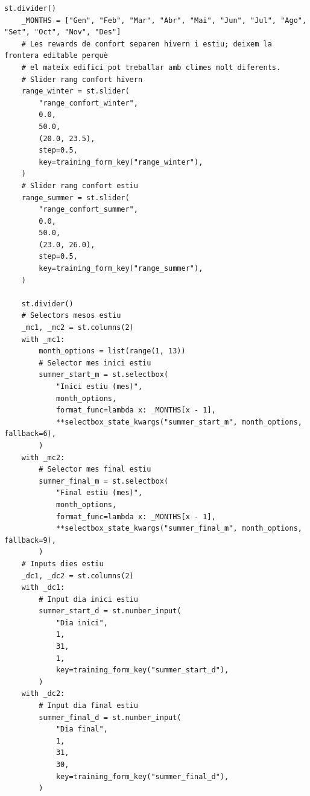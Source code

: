 \documentclass[10pt,a4paper]{article}
\begin{document}
\begin{lstlisting}[style=studioPython,caption={page\_components/training\_rewards.py},label={lst:page-components-training-rewards-py}]
    st.divider()
    _MONTHS = ["Gen", "Feb", "Mar", "Abr", "Mai", "Jun", "Jul", "Ago", "Set", "Oct", "Nov", "Des"]
    # Les rewards de confort separen hivern i estiu; deixem la frontera editable perquè
    # el mateix edifici pot treballar amb climes molt diferents.
    # Slider rang confort hivern
    range_winter = st.slider(
        "range_comfort_winter",
        0.0,
        50.0,
        (20.0, 23.5),
        step=0.5,
        key=training_form_key("range_winter"),
    )
    # Slider rang confort estiu
    range_summer = st.slider(
        "range_comfort_summer",
        0.0,
        50.0,
        (23.0, 26.0),
        step=0.5,
        key=training_form_key("range_summer"),
    )

    st.divider()
    # Selectors mesos estiu
    _mc1, _mc2 = st.columns(2)
    with _mc1:
        month_options = list(range(1, 13))
        # Selector mes inici estiu
        summer_start_m = st.selectbox(
            "Inici estiu (mes)",
            month_options,
            format_func=lambda x: _MONTHS[x - 1],
            **selectbox_state_kwargs("summer_start_m", month_options, fallback=6),
        )
    with _mc2:
        # Selector mes final estiu
        summer_final_m = st.selectbox(
            "Final estiu (mes)",
            month_options,
            format_func=lambda x: _MONTHS[x - 1],
            **selectbox_state_kwargs("summer_final_m", month_options, fallback=9),
        )
    # Inputs dies estiu
    _dc1, _dc2 = st.columns(2)
    with _dc1:
        # Input dia inici estiu
        summer_start_d = st.number_input(
            "Dia inici",
            1,
            31,
            1,
            key=training_form_key("summer_start_d"),
        )
    with _dc2:
        # Input dia final estiu
        summer_final_d = st.number_input(
            "Dia final",
            1,
            31,
            30,
            key=training_form_key("summer_final_d"),
        )


\end{lstlisting}
\end{document}
